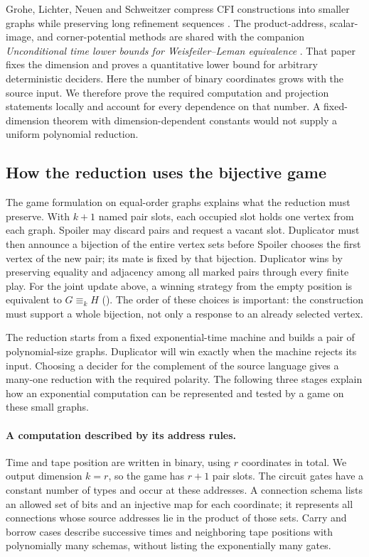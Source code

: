 \documentclass[11pt]{article}
\theoremstyle{definition}
\begin{document}
Grohe, Lichter, Neuen and Schweitzer compress CFI constructions into
smaller graphs while preserving long refinement sequences
\citep{cfiCompression2025}. The product-address,
scalar-image, and corner-potential methods are shared with the companion
\emph{Unconditional time lower bounds for Weisfeiler--Leman equivalence}
\citep[Sections~3--4]{CompanionFixedDimension}. That paper fixes the
dimension and proves a quantitative lower bound for arbitrary
deterministic deciders. Here the number of binary coordinates grows with
the source input. We therefore prove the required computation and
projection statements locally and account for every dependence on that
number. A fixed-dimension theorem with dimension-dependent constants
would not supply a uniform polynomial reduction.

\subsection{How the reduction uses the bijective game}

The game formulation on equal-order graphs explains what the reduction
must preserve.
With \(k+1\) named pair slots, each occupied slot holds one vertex
from each graph. Spoiler may discard pairs and request a vacant slot.
Duplicator must then announce a bijection of the entire vertex sets
before Spoiler chooses the first vertex of the new pair; its mate is
fixed by that bijection. Duplicator wins by preserving equality and
adjacency among all marked pairs through every finite play.
For the joint update above, a winning strategy from the empty position
is equivalent to \(G\equiv_k H\)
(). The order of these choices is important: the
construction must support a whole bijection, not only a response to an
already selected vertex.

The reduction starts from a fixed exponential-time machine and builds
a pair of polynomial-size graphs. Duplicator will win exactly when the
machine rejects its input. Choosing a decider for the complement of the
source language gives a many-one reduction with the required polarity.
The following three stages explain how an exponential computation can
be represented and tested by a game on these small graphs.

\paragraph{A computation described by its address rules.}
Time and tape position are written in binary, using \(r\) coordinates
in total. We output dimension \(k=r\), so the game has \(r+1\) pair
slots. The circuit gates have a constant number of types and occur
at these addresses. A connection schema lists an allowed set of bits
and an injective map for each coordinate; it represents all connections
whose source addresses lie in the product of those sets.
Carry and borrow cases describe successive times and neighboring tape
positions with polynomially many schemas, without listing the
exponentially many gates.
\end{document}
